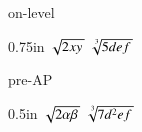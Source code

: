 \begin{taggedblock}{on-level}
    \begin{myProblems2}{}{0.75in}
        {
            $   \myRoot{2xy}   $ 
        }
        {
            $ \myRoot[3]{5def} $ 
        }
    \end{myProblems2}
\end{taggedblock}
\begin{taggedblock}{pre-AP}
    \begin{myProblems2}{}{0.5in}
        {
            $   \myRoot{2\alpha\beta}   $ 
        }
        {
            $ \myRoot[3]{7d^2ef} $ 
        }
    \end{myProblems2}
\end{taggedblock}
